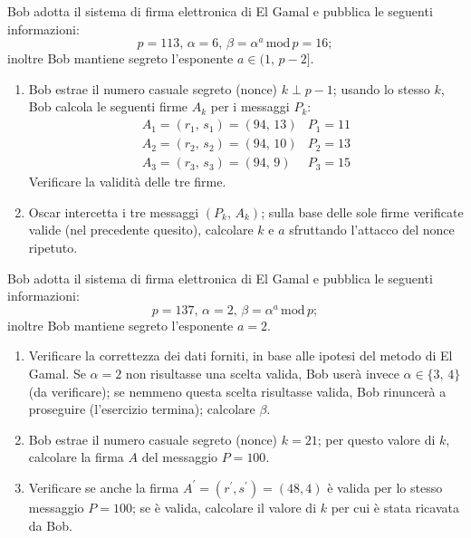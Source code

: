         Bob adotta il sistema di firma elettronica di El Gamal e pubblica le seguenti informazioni: \[
            p=113,\, \alpha = 6,\, \beta = \alpha^a\,\mathrm{mod}\,p=16
        ;\] inoltre Bob mantiene segreto l'esponente $a\in (1,\,p-2]$.
        \begin{enumerate}
            \item Bob estrae il numero casuale segreto (nonce) $k\perp p-1$; usando lo stesso $k$, 
                Bob calcola le seguenti firme $A_k$ per i messaggi $P_k$:
                \[\begin{array}{ll}
                    A_1=(r_1,\,s_1)=(94,\,13) & P_1=11\\
                    A_2=(r_2,\,s_2)=(94,\,10) & P_2=13\\
                    A_3=(r_3,\,s_3)=(94,\,9) & P_3=15
                \end{array}\]
                Verificare la validità delle tre firme.
            \item Oscar intercetta i tre messaggi $(P_k,\,A_k)$; sulla base delle sole firme verificate valide 
                (nel precedente quesito), calcolare $k$ e $a$ sfruttando l'attacco del nonce ripetuto.
        \end{enumerate}

        Bob adotta il sistema di firma elettronica di El Gamal e pubblica le seguenti informazioni: \[
            p=137,\, \alpha = 2,\, \beta = \alpha^a\,\mathrm{mod}\,p
        ;\] inoltre Bob mantiene segreto l'esponente $a=2$.
        \begin{enumerate}
            \item Verificare la correttezza dei dati forniti, in base alle ipotesi del metodo di El Gamal. 
                Se $\alpha=2$ non risultasse una scelta valida, Bob userà invece $\alpha\in \{3,\,4\}$ 
                (da verificare); se nemmeno questa scelta risultasse valida, Bob rinuncerà a proseguire 
                (l'esercizio termina); calcolare $\beta$.
            \item Bob estrae il numero casuale segreto (nonce) $k=21$; per questo valore di $k$, calcolare 
                la firma $A$ del messaggio $P=100$.
            \item Verificare se anche la firma $A^{\prime}=(r^{\prime}, s^{\prime})=(48,4)$ è valida per 
                lo stesso messaggio $P=100$; se è valida, calcolare il valore di $k$ per cui è stata ricavata da Bob.
        \end{enumerate}

